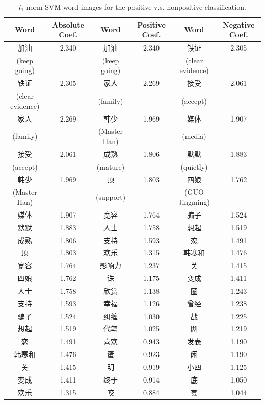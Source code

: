 \documentclass[11pt]{article}
\newcommand{\1}[1]{{\mathbf 1}\left\{#1\right\}}        %
\begin{document}
\begin{table}[!h]
\caption{$l_1$-norm SVM word images for the positive v.s. nonpositive classification.}
\centering
\begin{tabular}{|c|c||c|c||c|c|}
\hline
Word & Absolute Coef. & Word & Positive Coef. & Word & Negative Coef.\\ \hline \hline
加油 & 2.340 & 加油 & 2.340 & 铁证 & 2.305\\
(keep going) & & (keep going) & & (clear evidence) & \\\hline
铁证 & 2.305 & 家人 & 2.269 & 接受 & 2.061\\
(clear evidence) & & (family) & & (accept) & \\\hline
家人 & 2.269 & 韩少 & 1.969 & 媒体 & 1.907\\
(family) & & (Master Han) & & (media) & \\\hline
接受 & 2.061 & 成熟 & 1.806 & 默默 & 1.883\\
(accept) & & (mature) & & (quietly) & \\\hline
韩少 & 1.969 & 顶 & 1.803 & 四娘 & 1.762\\
(Master Han) & & (support) & & (GUO Jingming) & \\\hline
媒体 & 1.907 & 宽容 & 1.764 & 骗子 & 1.524\\ \hline
默默 & 1.883 & 人士 & 1.758 & 想起 & 1.519\\ \hline
成熟 & 1.806 & 支持 & 1.593 & 恋 & 1.491\\ \hline
顶 & 1.803 & 欢乐 & 1.315 & 韩寒和 & 1.476\\ \hline
宽容 & 1.764 & 影响力 & 1.237 & 关 & 1.415\\ \hline
四娘 & 1.762 & 诛 & 1.175 & 变成 & 1.411\\ \hline
人士 & 1.758 & 欣赏 & 1.138 & 圈 & 1.243\\ \hline
支持 & 1.593 & 幸福 & 1.126 & 曾经 & 1.238\\ \hline
骗子 & 1.524 & 纠缠 & 1.030 & 战 & 1.225\\ \hline
想起 & 1.519 & 代笔 & 1.025 & 网 & 1.219\\ \hline
恋 & 1.491 & 喜欢 & 0.943 & 发表 & 1.190\\ \hline
韩寒和 & 1.476 & 蛋 & 0.923 & 闲 & 1.190\\ \hline
关 & 1.415 & 明 & 0.919 & 小四 & 1.125\\ \hline
变成 & 1.411 & 终于 & 0.914 & 底 & 1.050\\ \hline
欢乐 & 1.315 & 咬 & 0.884 & 套 & 1.044\\ \hline
\end{tabular}
\label{tb:svmfullpos}
\end{table}
\end{document}
